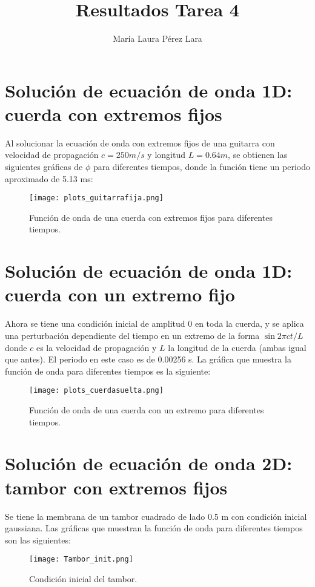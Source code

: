 \documentclass[a4paper,10pt]{article}
\begin{document}
\title{Resultados Tarea 4}

\author{María Laura Pérez Lara}

\maketitle
\section{Solución de ecuación de onda 1D: cuerda con extremos fijos}

Al solucionar la ecuación de onda con extremos fijos de una guitarra con velocidad de propagación $c=250 m/s$ y longitud $L=0.64m$, se obtienen las siguientes gráficas de $\phi$ para diferentes tiempos, donde la función tiene un periodo aproximado de 5.13 ms:

\begin{figure}[H]
    \centering
    \texttt{[image: plots\_guitarrafija.png]}
    \caption{Función de onda de una cuerda con extremos fijos para diferentes tiempos.}
\end{figure}

\section{Solución de ecuación de onda 1D: cuerda con un extremo fijo}

Ahora se tiene una condición inicial de amplitud 0 en toda la cuerda, y se aplica una perturbación dependiente del tiempo en un extremo de la forma $\sin{2\pi ct/L}$ donde $c$ es la velocidad de propagación y $L$ la longitud de la cuerda (ambas igual que antes). El periodo en este caso es de 0.00256 s. La gráfica que muestra la función de onda para diferentes tiempos es la siguiente:

\begin{figure}[H]
    \centering
    \texttt{[image: plots\_cuerdasuelta.png]}
    \caption{Función de onda de una cuerda con un extremo para diferentes tiempos.}
\end{figure}

\section{Solución de ecuación de onda 2D: tambor con extremos fijos}

Se tiene la membrana de un tambor cuadrado de lado 0.5 m con condición inicial gaussiana. Las gráficas que muestran la función de onda para diferentes tiempos son las siguientes:

\begin{figure}[H]
    \centering
    \texttt{[image: Tambor\_init.png]}
    \caption{Condición inicial del tambor.}
\end{figure}
\end{document}
